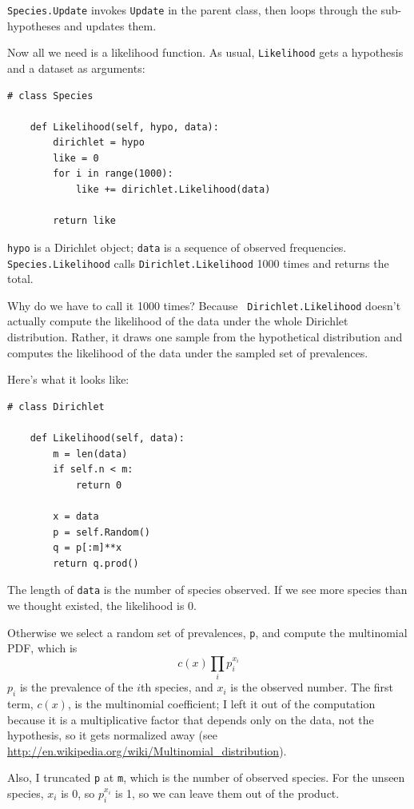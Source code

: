 \documentclass[12pt]{book}
\begin{document}
{\tt Species.Update} invokes {\tt Update} in the parent class,
then loops through the sub-hypotheses and updates them.

Now all we need is a likelihood function.  As usual,
{\tt Likelihood} gets a hypothesis and a dataset as arguments:

\begin{verbatim}
# class Species

    def Likelihood(self, hypo, data):
        dirichlet = hypo
        like = 0
        for i in range(1000):
            like += dirichlet.Likelihood(data)

        return like
\end{verbatim}

{\tt hypo} is a Dirichlet object; {\tt data} is a sequence of
observed frequencies.  {\tt Species.Likelihood} calls
{\tt Dirichlet.Likelihood} 1000 times and returns the total.

Why do we have to call it 1000 times?  Because {\tt
  Dirichlet.Likelihood} doesn't actually compute the likelihood of the
data under the whole Dirichlet distribution.  Rather, it draws one
sample from the hypothetical distribution and computes the likelihood
of the data under the sampled set of prevalences.

Here's what it looks like:

\begin{verbatim}
# class Dirichlet

    def Likelihood(self, data):
        m = len(data)
        if self.n < m:
            return 0

        x = data
        p = self.Random()
        q = p[:m]**x
        return q.prod()
\end{verbatim}

The length of {\tt data} is the number of species observed.  If
we see more species than we thought existed, the likelihood is 0.

Otherwise we select a random set of prevalences, {\tt p}, and
compute the multinomial PDF, which is
%
\[ c(x) \prod_i p_i^{x_i}\]
%
$p_i$ is the prevalence of the $i$th species, and $x_i$ is the
observed number.  The first term, $c(x)$, is the multinomial
coefficient; I left it out of the computation because it is
a multiplicative factor that depends only
on the data, not the hypothesis, so it gets normalized away
(see \url{http://en.wikipedia.org/wiki/Multinomial_distribution}).

Also, I truncated {\tt p} at {\tt m}, which is the number of
observed species.  For the unseen species, $x_i$ is 0, so
$p_i^{x_i}$ is 1, so we can leave them out of the product.
\end{document}
